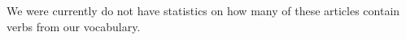 We were currently do not have statistics on how many of these articles contain verbs from our vocabulary.
